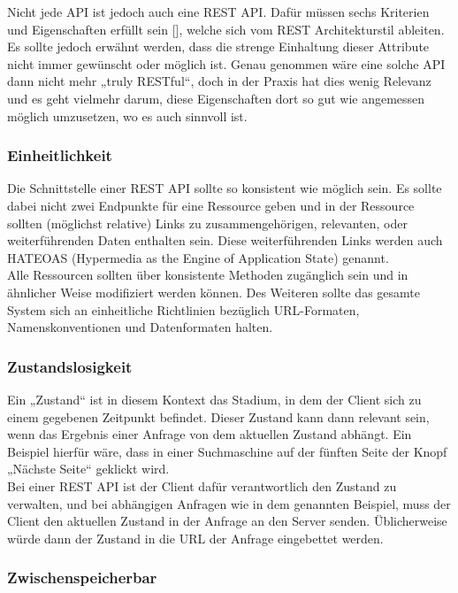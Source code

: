 Nicht jede API ist jedoch auch eine REST API. Dafür müssen sechs Kriterien und Eigenschaften erfüllt sein [\cite{fieldingDissertation}], welche sich vom REST Architekturstil ableiten. Es sollte jedoch erwähnt werden, dass die strenge Einhaltung dieser Attribute nicht immer gewünscht oder möglich ist. Genau genommen wäre eine solche API dann nicht mehr „truly RESTful“, doch in der Praxis hat dies wenig Relevanz und es geht vielmehr darum, diese Eigenschaften dort so gut wie angemessen möglich umzusetzen, wo es auch sinnvoll ist.

\subsubsection*{Einheitlichkeit}
\label{subsubsec:rest_einheitlichkeit}

Die Schnittstelle einer REST API sollte so konsistent wie möglich sein. Es sollte dabei nicht zwei Endpunkte für eine Ressource geben und in der Ressource sollten (möglichst relative) Links zu zusammengehörigen, relevanten, oder weiterführenden Daten enthalten sein. Diese weiterführenden Links werden auch HATEOAS (Hypermedia as the Engine of Application State) genannt.\\
Alle Ressourcen sollten über konsistente Methoden zugänglich sein und in ähnlicher Weise modifiziert werden können. Des Weiteren sollte das gesamte System sich an einheitliche Richtlinien bezüglich URL-Formaten, Namenskonventionen und Datenformaten halten.

\subsubsection*{Zustandslosigkeit}
\label{subsubsec:rest_zustandslosigkeit}

Ein „Zustand“ ist in diesem Kontext das Stadium, in dem der Client sich zu einem gegebenen Zeitpunkt befindet. Dieser Zustand kann dann relevant sein, wenn das Ergebnis einer Anfrage von dem aktuellen Zustand abhängt. Ein Beispiel hierfür wäre, dass in einer Suchmaschine auf der fünften Seite der Knopf „Nächste Seite“ geklickt wird.\\
Bei einer REST API ist der Client dafür verantwortlich den Zustand zu verwalten, und bei abhängigen Anfragen wie in dem genannten Beispiel, muss der Client den aktuellen Zustand in der Anfrage an den Server senden. Üblicherweise würde dann der Zustand in die URL der Anfrage eingebettet werden.

\subsubsection*{Zwischenspeicherbar}
\label{subsubsec:rest_zwischenspeicherbar}

